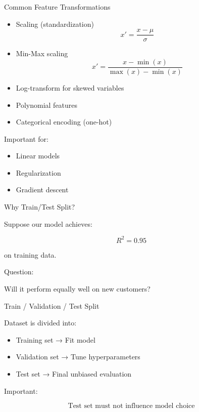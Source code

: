 \documentclass{beamer}
\begin{document}
\begin{frame}{Common Feature Transformations}

\begin{itemize}
    \item Scaling (standardization)
    \[
    x' = \frac{x - \mu}{\sigma}
    \]

    \item Min-Max scaling
    \[ x' = \frac{x - \min(x)}{\max(x) - \min(x)} \]

    \item Log-transform for skewed variables

    \item Polynomial features

    \item Categorical encoding (one-hot)
\end{itemize}

\vspace{0.5cm}

Important for:

\begin{itemize}
    \item Linear models
    \item Regularization
    \item Gradient descent
\end{itemize}

\end{frame}

\begin{frame}{Why Train/Test Split?}

Suppose our model achieves:

\[
R^2 = 0.95
\]

on training data.

\vspace{0.5cm}

Question:

Will it perform equally well on new customers?

\end{frame}

\begin{frame}{Train / Validation / Test Split}

Dataset is divided into:

\begin{itemize}
    \item Training set → Fit model
    \item Validation set → Tune hyperparameters
    \item Test set → Final unbiased evaluation
\end{itemize}

\vspace{0.5cm}

Important:

\[
\text{Test set must not influence model choice}
\]

\end{frame}
\end{document}
